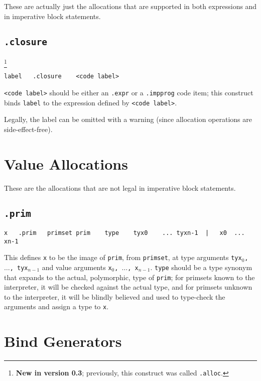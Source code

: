 \documentclass{report}
\newcommand\stringcode[1]{\texttt{#1}}
\newcommand\new[2]{\footnote{\textbf{New in version #1}; previously, #2}}
\begin{document}
These are actually just the allocations that are supported in both expressions and in imperative block statements.

\subsection{\stringcode{.closure}}
\new{0.3}{this construct was called \stringcode{.alloc}.}

\begin{verbatim}
label	.closure	<code label>
\end{verbatim}

\stringcode{<code label>} should be either an \stringcode{.expr} or a \stringcode{.impprog} code item;
this construct binds \stringcode{label} to the expression defined by \stringcode{<code label>}.

Legally, the label can be omitted with a warning (since allocation operations are side-effect-free).

\section{Value Allocations}
\label{value_alloc}

These are the allocations that are not legal in imperative block statements.

\subsection{\stringcode{.prim}}

\begin{verbatim}
x	.prim	primset	prim	type	tyx0	...	tyxn-1	|	x0	...	xn-1
\end{verbatim}

This defines \stringcode{x} to be the image of \stringcode{prim}, from \stringcode{primset},
at type arguments \stringcode{tyx$_0$, $\ldots$, tyx$_{n-1}$}
and value arguments \stringcode{x$_0$, $\ldots$, x$_{n-1}$}.
\stringcode{type} should be a type synonym that expands to the actual, polymorphic, type of \stringcode{prim};
for primsets known to the interpreter, it will be checked against the actual type,
and for primsets unknown to the interpreter,
it will be blindly believed and used to type-check the arguments and assign a type to \stringcode{x}.

\section{Bind Generators}
\label{bind}
\end{document}
